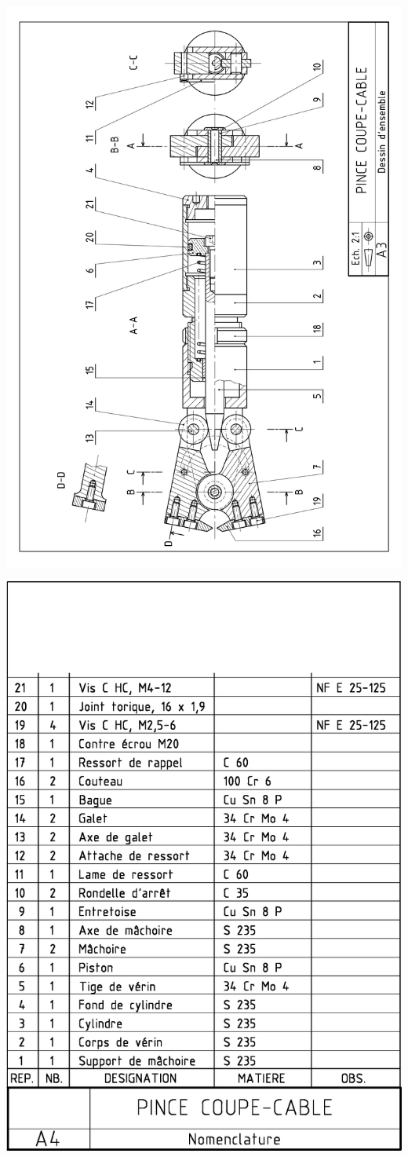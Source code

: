 \documentclass[11pt,oneside]{article}
\begin{document}
\begin{center}
\includegraphics[width=.9\textwidth]{png/fig2}
\end{center}

\begin{center}
\includegraphics[width=.8\textwidth]{png/fig1}
\end{center}
 
\end{document}
